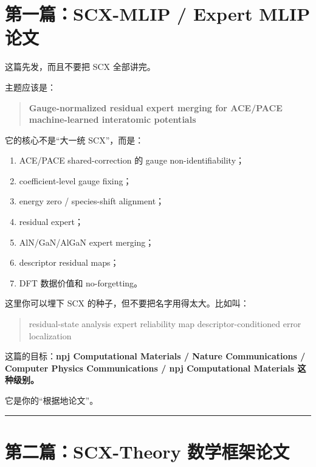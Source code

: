 \documentclass[
  12pt,
]{ctexart}
\providecommand{\tightlist}{%
  \setlength{\itemsep}{0pt}\setlength{\parskip}{0pt}}
\begin{document}
\section{\texorpdfstring{\textbf{第一篇：SCX-MLIP / Expert MLIP
论文}}{第一篇：SCX-MLIP / Expert MLIP 论文}}\label{ux7b2cux4e00ux7bc7scx-mlip-expert-mlip-ux8bbaux6587}

这篇先发，而且不要把 SCX 全部讲完。

主题应该是：

\begin{quote}
\textbf{Gauge-normalized residual expert merging for ACE/PACE
machine-learned interatomic potentials}
\end{quote}

它的核心不是``大一统 SCX''，而是：

\begin{enumerate}
\def\labelenumi{\arabic{enumi}.}
\tightlist
\item
  ACE/PACE shared-correction 的 gauge non-identifiability；
\item
  coefficient-level gauge fixing；
\item
  energy zero / species-shift alignment；
\item
  residual expert；
\item
  AlN/GaN/AlGaN expert merging；
\item
  descriptor residual maps；
\item
  DFT 数据价值和 no-forgetting。
\end{enumerate}

这里你可以埋下 SCX 的种子，但不要把名字用得太大。比如叫：

\begin{quote}
residual-state analysis expert reliability map descriptor-conditioned
error localization
\end{quote}

这篇的目标：\textbf{npj Computational Materials / Nature Communications
/ Computer Physics Communications / npj Computational Materials
这种级别。}

它是你的``根据地论文''。

\begin{center}\rule{0.5\linewidth}{0.5pt}\end{center}

\section{\texorpdfstring{\textbf{第二篇：SCX-Theory
数学框架论文}}{第二篇：SCX-Theory 数学框架论文}}\label{ux7b2cux4e8cux7bc7scx-theory-ux6570ux5b66ux6846ux67b6ux8bbaux6587}
\end{document}
